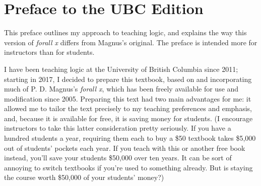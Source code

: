 

\iffalse

\chapter*{Preface to the UBC Edition}
\label{ch.preface}

This preface outlines my approach to teaching logic, and explains the way this version of \emph{forall x} differs from Magnus's original. The preface is intended more for instructors than for students. 

I have been teaching logic at the University of British Columbia since 2011; starting in 2017, I decided to prepare this textbook, based on and incorporating much of P. D. Magnus's \emph{forall x}, which has been freely available for use and modification since 2005. Preparing this text had two main advantages for me: it allowed me to tailor the text precisely to my teaching preferences and emphasis, and, because it is available for free, it is saving money for students. (I encourage instructors to take this latter consideration pretty seriously. If you have a hundred students a year, requiring them each to buy a \$50 textbook takes \$5,000 out of students' pockets each year. If you teach with this or another free book instead, you'll save your students \$50,000 over ten years. It can be sort of annoying to switch textbooks if you're used to something already. But is staying the course worth \$50,000 of your students' money?)

